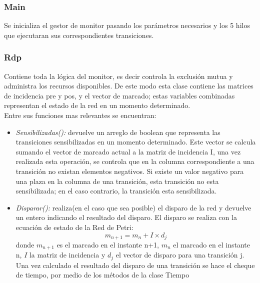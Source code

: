 \documentclass[10pt, a4paper,notitlepage]{article}
\begin{document}
\subsubsection{Main}
Se inicializa el gestor de monitor pasando los parámetros necesarios y los 5 hilos que ejecutaran sus correspondientes transiciones.

\subsubsection{Rdp}
Contiene toda la lógica del monitor, es decir controla la exclusión mutua y administra los recursos disponibles. De este modo esta clase contiene las matrices de incidencia pre y pos, y el vector de marcado; estas variables combinadas representan el estado de la red en un momento determinado. \\
Entre sus funciones mas relevantes se encuentran:

\begin{itemize}
	\item \textit{Sensibilizadas():} devuelve un arreglo de boolean que representa las transiciones sensibilizadas en un momento determinado. Este vector se calcula sumando el vector de marcado actual a la matriz de incidencia I, una vez realizada esta operación, se controla que en la columna correspondiente a una transición no existan elementos negativos. Si existe un valor negativo para una plaza en la columna de una transición, esta transición no esta sensibilizada; en el caso contrario, la transición esta sensibilizada.
	\item \textit{Disparar():} realiza(en el caso que sea posible) el disparo de la red y devuelve un entero indicando el resultado del disparo. El disparo se realiza con la ecuación de estado de la Red de Petri:
	\begin{equation*}
	m_{n+1} = m_n + I \times d_j
	\end{equation*}
	donde $ m_{n+1} $ es el marcado en el instante n+1, $m_n$ el marcado en el instante n, $I$ la matriz de incidencia y $d_j$ el vector de disparo para una transición j.\\
	Una vez calculado el resultado del disparo de una transición se hace el cheque de tiempo, por medio de los métodos de la clase Tiempo
	
\end{itemize}
\end{document}
